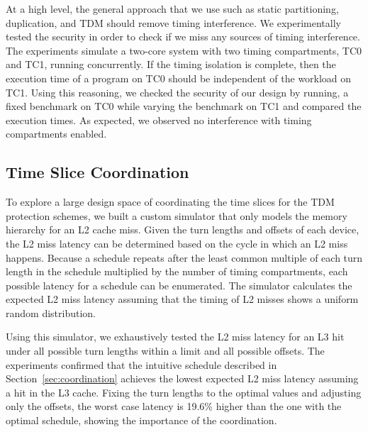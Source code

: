 At a high level, the general approach that we use such as static partitioning,
duplication, and TDM should remove timing interference. We experimentally
tested the security in order to check if we miss any sources of timing interference.
The experiments simulate a two-core 
system with two timing compartments, TC0 and
TC1, running concurrently. 
If the timing isolation is complete, then the execution time of a program on 
TC0 should be independent of the workload on TC1.
Using this reasoning, we checked the
security of our design by running, a fixed benchmark
on TC0 while varying the benchmark on TC1 and compared the execution times. 
As expected, 
we observed no interference with timing compartments enabled.

\subsection{Time Slice Coordination}
\label{sec:eval_coord}

To explore a large design space of coordinating the time slices for the TDM 
protection schemes, we built a custom simulator that only models the memory
hierarchy for an L2 cache miss.
Given the turn lengths and offsets of each device, the L2 miss latency can
be determined based on the cycle in which an L2 miss happens.
Because a schedule repeats after the least common multiple of each turn length in 
the schedule multiplied by the number of timing compartments, each possible 
latency for a schedule can be enumerated. The simulator calculates
the expected L2 miss latency assuming that the timing of L2 misses shows a
uniform random distribution.

Using this simulator, we exhaustively tested the L2 miss latency for an
L3 hit under all possible turn lengths within a limit and all possible
offsets. The experiments confirmed that 
the intuitive schedule described in 
Section~\ref{sec:coordination} achieves the lowest expected L2 miss latency
assuming a hit in the L3 cache.
Fixing the turn lengths to the optimal values and adjusting only the offsets,
the worst case latency is 19.6\% higher than the one with the optimal schedule, showing
the importance of the coordination.


